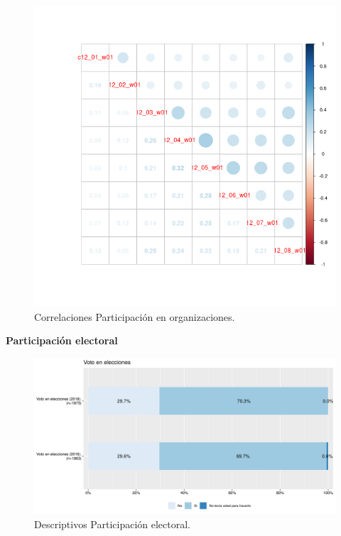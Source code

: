 \documentclass[
  12pt,
]{book}
\begin{document}
\begin{figure}[H]

{\centering \includegraphics[width=1\linewidth,height=1\textheight]{output/graphs/participacion-organizaciones_cor} 

}

\caption{Correlaciones Participación en organizaciones.}\label{fig:participacion-organizaciones-cor}
\end{figure}

\textbf{Participación electoral}

\begin{figure}[H]

{\centering \includegraphics[width=1\linewidth,height=1\textheight]{output/graphs/participacion-electoral} 

}

\caption{Descriptivos Participación electoral.}\label{fig:participacion-electoral}
\end{figure}
\end{document}
